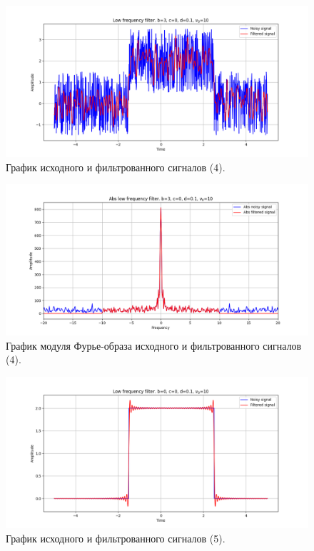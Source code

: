 \documentclass[a4paper, 12pt]{article}
\begin{document}
    \begin{figure}[!htb]
        \centering
        \includegraphics[scale=0.48]{5_u_flt_u_nohigh.png}
        \captionsetup{skip=0pt}
        \caption{График исходного и фильтрованного сигналов (4).}
        \label{fig:fig7}
    \end{figure}
    \begin{figure}[!htb]
        \centering
        \includegraphics[scale=0.48]{5_abs_u_U_nohigh.png}
        \captionsetup{skip=0pt}
        \caption{График модуля Фурье-образа исходного и фильтрованного сигналов (4).}
        \label{fig:fig8}
    \end{figure}
    \begin{figure}[!htb]
        \centering
        \includegraphics[scale=0.48]{4_u_flt_u_nohigh.png}
        \captionsetup{skip=0pt}
        \caption{График исходного и фильтрованного сигналов (5).}
        \label{fig:fig9}
    \end{figure}
\end{document}
